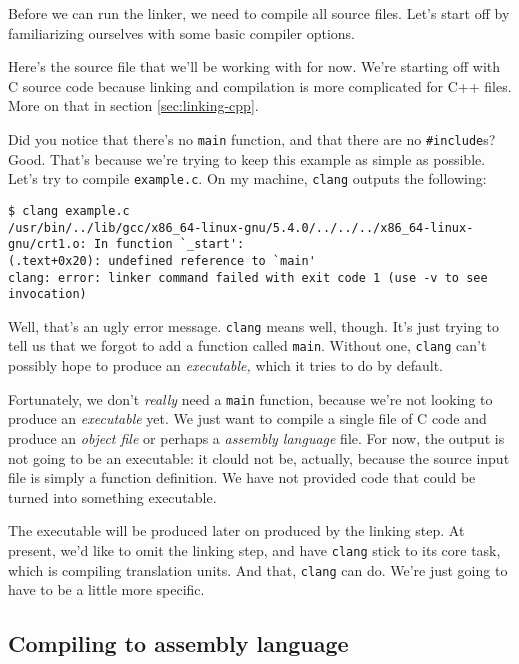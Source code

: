 \documentclass[12pt,a4paper]{article}
\newcommand{\C}{C}
\newcommand{\Cpp}{C++}
\newcommand{\clang}{\texttt{clang}}
\newcommand{\CC}{\clang{}}
\newcommand{\labelname}[1]{\texttt{#1}}
\newcommand{\functionname}[1]{\labelname{#1}}
\newcommand{\filename}[1]{\texttt{#1}}
\begin{document}
Before we can run the linker, we need to compile all source files. Let's start off by familiarizing ourselves with some basic compiler options. 

Here's the source file that we'll be working with for now. We're starting off with \C{} source code because linking and compilation is more complicated for \Cpp{} files. More on that in section \ref{sec:linking-cpp}.



Did you notice that there's no \functionname{main} function, and that there are no \texttt{\#include}s? Good. That's because we're trying to keep this example as simple as possible. Let's try to compile \filename{example.c}. On my machine, \CC{} outputs the following:

\begin{lstlisting}[caption=output for \texttt{clang example.c},label=lst:clang-muladd]
$ clang example.c
/usr/bin/../lib/gcc/x86_64-linux-gnu/5.4.0/../../../x86_64-linux-gnu/crt1.o: In function `_start':
(.text+0x20): undefined reference to `main'
clang: error: linker command failed with exit code 1 (use -v to see invocation)
\end{lstlisting}

Well, that's an ugly error message. \CC{} means well, though. It's just trying to tell us that we forgot to add a function called \functionname{main}. Without one, \CC{} can't possibly hope to produce an \emph{executable,} which it tries to do by default.

Fortunately, we don't \emph{really} need a \functionname{main} function, because we're not looking to produce an \emph{executable} yet. We just want to compile a single file of \C{} code and produce an \emph{object file} or perhaps a \emph{assembly language} file. For now, the output is not going to be an executable: it clould not be, actually, because the source input file is simply a function definition. We have not provided code that could be turned into something executable.

The executable will be produced later on produced by the linking step. At present, we'd like to omit the linking step, and have \CC{} stick to its core task, which is compiling translation units. And that, \CC{} can do. We're just going to have to be a little more specific.

\subsection{Compiling to assembly language}
\end{document}
